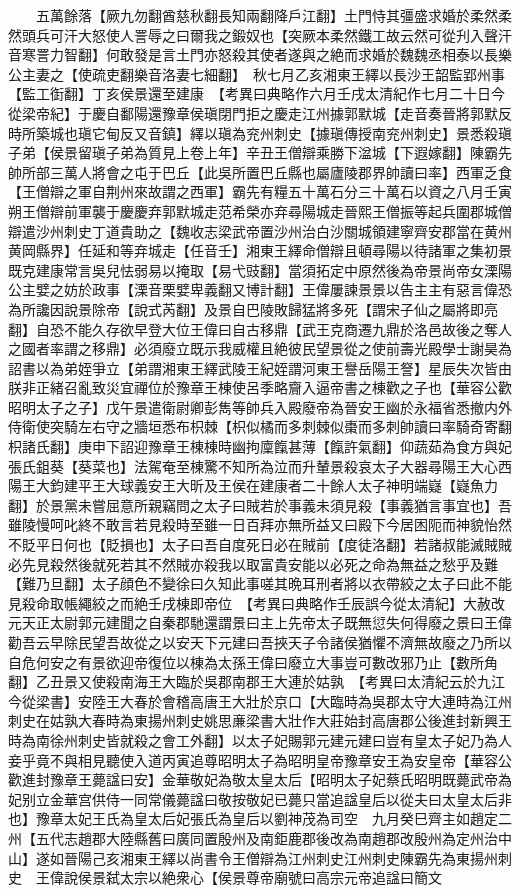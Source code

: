 　　五萬餘落【厥九勿翻酋慈秋翻長知兩翻降戶江翻】土門恃其彊盛求婚於柔然柔然頭兵可汗大怒使人詈辱之曰爾我之鍛奴也【突厥本柔然鐵工故云然可從刋入聲汗音寒詈力智翻】何敢發是言土門亦怒殺其使者遂與之絶而求婚於魏魏丞相泰以長樂公主妻之【使疏吏翻樂音洛妻七細翻】　秋七月乙亥湘東王繹以長沙王韶監郢州事【監工衘翻】丁亥侯景還至建康　【考異曰典略作六月壬戌太清紀作七月二十日今從梁帝紀】于慶自鄱陽還豫章侯瑱閉門拒之慶走江州據郭默城【走音奏晉將郭默反時所築城也瑱它甸反又音鎮】繹以瑱為兖州刺史【據瑱傳授南兖州刺史】景悉殺瑱子弟【侯景留瑱子弟為質見上卷上年】辛丑王僧辯乘勝下湓城【下遐嫁翻】陳霸先帥所部三萬人將會之屯于巴丘【此吳所置巴丘縣也屬廬陵郡界帥讀曰率】西軍乏食【王僧辯之軍自荆州來故謂之西軍】霸先有糧五十萬石分三十萬石以資之八月壬寅朔王僧辯前軍襲于慶慶弃郭默城走范希榮亦弃尋陽城走晉熙王僧振等起兵圍郡城僧辯遣沙州刺史丁道貴助之【魏收志梁武帝置沙州治白沙關城領建寧齊安郡當在黄州黄岡縣界】任延和等弃城走【任音壬】湘東王繹命僧辯且頓尋陽以待諸軍之集初景既克建康常言吳兒怯弱易以掩取【易弋豉翻】當須拓定中原然後為帝景尚帝女溧陽公主嬖之妨於政事【溧音栗嬖卑義翻又博計翻】王偉屢諫景景以告主主有惡言偉恐為所讒因說景除帝【說式芮翻】及景自巴陵敗歸猛將多死【謂宋子仙之屬將即亮翻】自恐不能久存欲早登大位王偉曰自古移鼎【武王克商遷九鼎於洛邑故後之奪人之國者率謂之移鼎】必須廢立既示我威權且絶彼民望景從之使前壽光殿學士謝昊為詔書以為弟姪爭立【弟謂湘東王繹武陵王紀姪謂河東王譽岳陽王詧】星辰失次皆由朕非正緒召亂致災宜禪位於豫章王棟使呂季略齎入逼帝書之棟歡之子也【華容公歡昭明太子之子】戊午景遣衛尉卿彭雋等帥兵入殿廢帝為晉安王幽於永福省悉撤内外侍衛使突騎左右守之牆垣悉布枳棘【枳似橘而多刺棘似棗而多刺帥讀曰率騎奇寄翻枳諸氏翻】庚申下詔迎豫章王棟棟時幽拘廩餼甚薄【餼許氣翻】仰蔬茹為食方與妃張氏鉏葵【葵菜也】法駕奄至棟驚不知所為泣而升輦景殺哀太子大器尋陽王大心西陽王大鈞建平王大球義安王大昕及王侯在建康者二十餘人太子神明端嶷【嶷魚力翻】於景黨未嘗屈意所親竊問之太子曰賊若於事義未須見殺【事義猶言事宜也】吾雖陵慢呵叱終不敢言若見殺時至雖一日百拜亦無所益又曰殿下今居困阨而神貌怡然不貶平日何也【貶損也】太子曰吾自度死日必在賊前【度徒洛翻】若諸叔能滅賊賊必先見殺然後就死若其不然賊亦殺我以取富貴安能以必死之命為無益之愁乎及難【難乃旦翻】太子顔色不變徐曰久知此事嗟其晩耳刑者將以衣帶絞之太子曰此不能見殺命取帳繩絞之而絶壬戌棟即帝位　【考異曰典略作壬辰誤今從太清紀】大赦改元天正太尉郭元建聞之自秦郡馳還謂景曰主上先帝太子既無愆失何得廢之景曰王偉勸吾云早除民望吾故從之以安天下元建曰吾挾天子令諸侯猶懼不濟無故廢之乃所以自危何安之有景欲迎帝復位以棟為太孫王偉曰廢立大事豈可數改邪乃止【數所角翻】乙丑景又使殺南海王大臨於吳郡南郡王大連於姑孰　【考異曰太清紀云於九江今從梁書】安陸王大春於會稽高唐王大壯於京口【大臨時為吳郡太守大連時為江州刺史在姑孰大春時為東揚州刺史姚思亷梁書大壯作大莊始封高唐郡公後進封新興王時為南徐州刺史皆就殺之會工外翻】以太子妃賜郭元建元建曰豈有皇太子妃乃為人妾乎竟不與相見聽使入道丙寅追尊昭明太子為昭明皇帝豫章安王為安皇帝【華容公歡進封豫章王薨諡曰安】金華敬妃為敬太皇太后【昭明太子妃蔡氏昭明既薨武帝為妃别立金華宫供侍一同常儀薨諡曰敬按敬妃已薨只當追諡皇后以從夫曰太皇太后非也】豫章太妃王氏為皇太后妃張氏為皇后以劉神茂為司空　九月癸巳齊主如趙定二州【五代志趙郡大陸縣舊曰廣同置殷州及南鉅鹿郡後改為南趙郡改殷州為定州治中山】遂如晉陽己亥湘東王繹以尚書令王僧辯為江州刺史江州刺史陳霸先為東揚州刺史　王偉說侯景弑太宗以絶衆心【侯景尊帝廟號曰高宗元帝追諡曰簡文